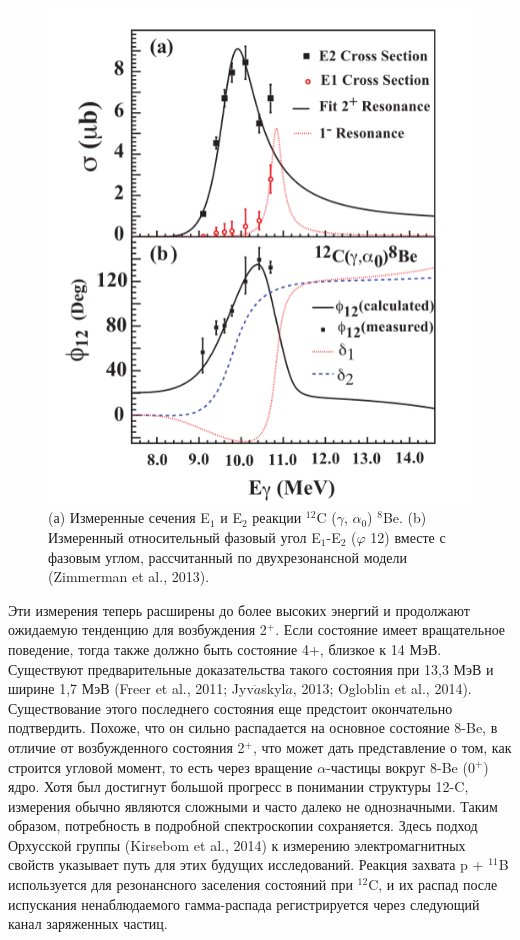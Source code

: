 \documentclass[fontsize=14pt]{scrreport}
\begin{document}
\begin{figure}[!ht]
\centerline{\includegraphics[scale=.5]{picture4.png}}
\caption{(а) Измеренные сечения E$_{1}$ и E$_{2}$ реакции $^{12}$C ($\gamma$, $\alpha_{0}$) $^{8}$Be. (b) Измеренный относительный фазовый угол E$_{1}$-E$_{2}$ ($\varphi$ 12) вместе с фазовым углом, рассчитанный по двухрезонансной модели (Zimmerman et al., 2013).}
\label{fig3}
\end{figure}
Эти измерения теперь расширены до более высоких энергий и продолжают ожидаемую тенденцию для возбуждения 2$^{+}$. Если состояние имеет вращательное поведение, тогда также должно быть состояние 4+, близкое к 14 МэВ. Существуют предварительные доказательства такого состояния при 13,3 МэВ и ширине 1,7 МэВ (Freer et al., 2011; Jyv$\ddot{a}$skyl$\ddot{a}$, 2013; Ogloblin et al., 2014). Существование этого последнего состояния еще предстоит окончательно подтвердить. Похоже, что он сильно распадается на основное состояние 8-Be, в отличие от возбужденного состояния 2$^{+}$, что может дать представление о том, как строится угловой момент, то есть через вращение $\alpha$-частицы вокруг 8-Be (0$^{+}$) ядро. Хотя был достигнут большой прогресс в понимании структуры 12-C, измерения обычно являются сложными и часто далеко не однозначными. Таким образом, потребность в подробной спектроскопии сохраняется. Здесь подход Орхусской группы (Kirsebom et al., 2014) к измерению электромагнитных свойств указывает путь для этих будущих исследований. Реакция захвата p + $^{11}$B используется для резонансного заселения состояний при $^{12}$C, и их распад после испускания ненаблюдаемого гамма-распада регистрируется через следующий канал заряженных частиц.
\end{document}
